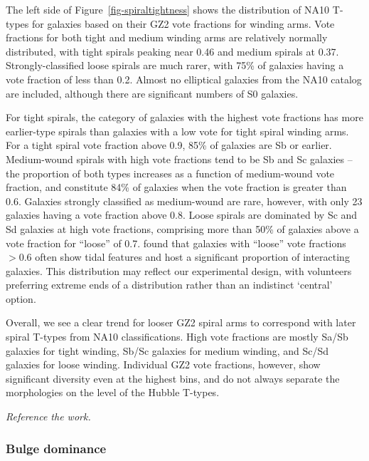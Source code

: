 \documentclass[useAMS,usenatbib]{mn2e}
\begin{document}
The left side of Figure~\ref{fig-spiraltightness} shows the distribution of NA10 T-types for galaxies based on their GZ2 vote fractions for winding arms. Vote fractions for both tight and medium winding arms are relatively normally distributed, with tight spirals peaking near 0.46 and medium spirals at 0.37. Strongly-classified loose spirals are much rarer, with 75\% of galaxies having a vote fraction of less than 0.2. Almost no elliptical galaxies from the NA10 catalog are included, although there are significant numbers of S0 galaxies. 

For tight spirals, the category of galaxies with the highest vote fractions has more earlier-type spirals than galaxies with a low vote for tight spiral winding arms. For a tight spiral vote fraction above 0.9, 85\% of galaxies are Sb or earlier. Medium-wound spirals with high vote fractions tend to be Sb and Sc galaxies -- the proportion of both types increases as a function of medium-wound vote fraction, and constitute 84\% of galaxies when the vote fraction is greater than 0.6. Galaxies strongly classified as medium-wound are rare, however, with only 23 galaxies having a vote fraction above 0.8.  Loose spirals are dominated by Sc and Sd galaxies at high vote fractions, comprising more than 50\% of galaxies above a vote fraction for ``loose'' of 0.7. \citet{cas13} found that galaxies with ``loose'' vote fractions $>0.6$ often show tidal features and host a significant proportion of interacting galaxies. This distribution may reflect our experimental design, with volunteers preferring extreme ends of a distribution rather than an indistinct `central' option. 

Overall, we see a clear trend for looser GZ2 spiral arms to correspond with later spiral T-types from NA10 classifications. High vote fractions are mostly Sa/Sb galaxies for tight winding, Sb/Sc galaxies for medium winding, and Sc/Sd galaxies for loose winding. Individual GZ2 vote fractions, however, show significant diversity even at the highest bins, and do not always separate the morphologies on the level of the Hubble T-types. 

{\em Reference the \citet{dav13} work.}


\subsubsection{Bulge dominance}
\end{document}
